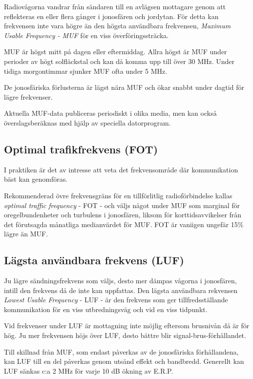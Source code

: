Radiovågorna vandrar från sändaren till en avlägsen mottagare genom
att reflekteras en eller flera gånger i jonosfären och jordytan. För
detta kan frekvensen inte vara högre än den högsta användbara
frekvensen, \emph{Maximum Usable Frequency - MUF} för en viss
överföringssträcka.

MUF är högst mitt på dagen eller eftermiddag. Allra högst är MUF under
perioder av högt solfläckstal och kan då komma upp till över 30
MHz. Under tidiga morgontimmar sjunker MUF ofta under 5 MHz.

De jonosfäriska förlusterna är lägst nära MUF och ökar snabbt under
dagtid för lägre frekvenser.

Aktuella MUF-data publiceras periodiskt i olika media, men kan också
överslagsberäknas med hjälp av speciella datorprogram.

\subsection{Optimal trafikfrekvens (FOT)}

I praktiken är det av intresse att veta det frekvensområde där
kommunikation bäst kan genomföras.

Rekommenderad övre frekvensgräns för en tillförlitlig radioförbindelse
kallas \emph{optimal traffic frequency} - FOT - och väljs något under
MUF som marginal för oregelbundenheter och turbulens i jonosfären,
liksom för korttidsavvikelser från det förutsagda månatliga
medianvärdet för MUF. FOT är vaniigen ungefär 15\% lägre än MUF.

\subsection{Lägsta användbara frekvens (LUF)}

Ju lägre sändningsfrekvens som väljs, desto mer dämpas vågorna i
jonosfären, intill den frekvens då de inte kan uppfattas. Den lägsta
användbara rekvensen \emph{Lowest Usable Frequency} - LUF - är den
frekvens som ger tillfredsställande kommunikation för en viss
utbredningsväg och vid en viss tidpunkt.

Vid frekvenser under LUF är mottagning inte möjlig eftersom brusnivån
då är för hög.  Ju mer frekvensen höjs över LUF, desto bättre blir
signal-brus-förhållandet.

Till skillnad från MUF, som endast påverkas av de jonosfäriska
förhållandena, kan LUF till en del påverkas genom utsänd effekt och
bandbredd. Generellt kan LUF sänkas c:a 2 MHz för varje 10 dB ökning
av E.R.P.

